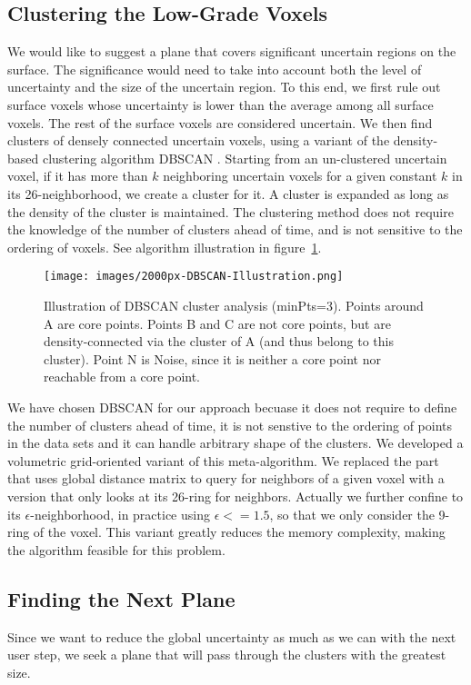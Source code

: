 \subsection{Clustering the Low-Grade Voxels}
We would like to suggest a plane that covers significant uncertain regions on the surface. The significance would need to take into account both the level of uncertainty and the size of the uncertain region. To this end, we first rule out surface voxels whose uncertainty is lower than the average among all surface voxels. The rest of the surface voxels are considered uncertain. We then find clusters of densely connected uncertain voxels, using a variant of the density-based clustering algorithm DBSCAN \cite{dbscan96kdddm}. Starting from an un-clustered uncertain voxel, if it has more than $k$ neighboring uncertain voxels for a given constant $k$ in its 26-neighborhood, we create a cluster for it. A cluster is expanded as long as the density of the cluster is maintained. The clustering method does not require the knowledge of the number of clusters ahead of time, and is not sensitive to the ordering of voxels. See algorithm illustration in figure~\ref{fig:dbscan}.

\begin{figure}[htb]
	\centering
		\texttt{[image: images/2000px-DBSCAN-Illustration.png]}
			\caption[DBSCAN Illustration]{
				Illustration of DBSCAN cluster analysis (minPts=3).
				Points around A are core points. Points B and C are not core points, but are density-connected via the cluster of A (and thus belong to this cluster). Point N is Noise, since it is neither a core point nor reachable from a core point.
		}\label{fig:dbscan}
\end{figure}

We have chosen DBSCAN for our approach becuase it does not require to define the number of clusters ahead of time, it is not senstive to the ordering of points in the data sets and it can handle arbitrary shape of the clusters.
We developed a volumetric grid-oriented variant of this meta-algorithm. We replaced the part that uses global distance matrix to query for neighbors of a given voxel with a version that only looks at its 26-ring for neighbors. Actually we further confine to its $ \epsilon $-neighborhood, in practice using $ \epsilon <= 1.5 $, so that we only consider the 9-ring of the voxel.
This variant greatly reduces the memory complexity, making the algorithm feasible for this problem. 

\subsection{Finding the Next Plane}
Since we want to reduce the global uncertainty as much as we can with the next user step, we seek a plane that will pass through the clusters with the greatest size. 


